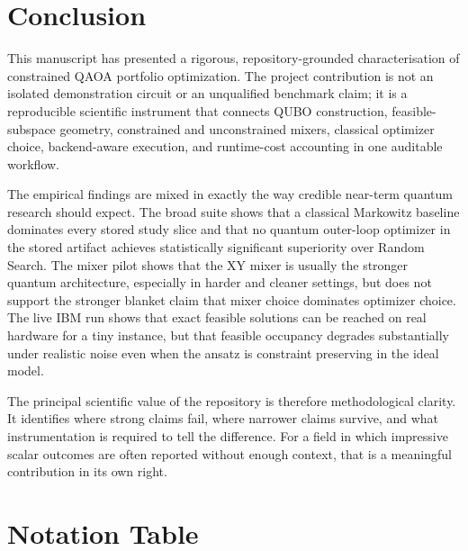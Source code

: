 \documentclass[11pt]{article}
\begin{document}
\section{Conclusion}\label{sec:conclusion}

This manuscript has presented a rigorous, repository-grounded characterisation of constrained QAOA portfolio optimization. The project contribution is not an isolated demonstration circuit or an unqualified benchmark claim; it is a reproducible scientific instrument that connects QUBO construction, feasible-subspace geometry, constrained and unconstrained mixers, classical optimizer choice, backend-aware execution, and runtime-cost accounting in one auditable workflow.

The empirical findings are mixed in exactly the way credible near-term quantum research should expect. The broad suite shows that a classical Markowitz baseline dominates every stored study slice and that no quantum outer-loop optimizer in the stored artifact achieves statistically significant superiority over Random Search. The mixer pilot shows that the \(\mathrm{XY}\) mixer is usually the stronger quantum architecture, especially in harder and cleaner settings, but does not support the stronger blanket claim that mixer choice dominates optimizer choice. The live IBM run shows that exact feasible solutions can be reached on real hardware for a tiny instance, but that feasible occupancy degrades substantially under realistic noise even when the ansatz is constraint preserving in the ideal model.

The principal scientific value of the repository is therefore methodological clarity. It identifies where strong claims fail, where narrower claims survive, and what instrumentation is required to tell the difference. For a field in which impressive scalar outcomes are often reported without enough context, that is a meaningful contribution in its own right.




\appendix

\section{Notation Table}\label{app:notation}
\end{document}
